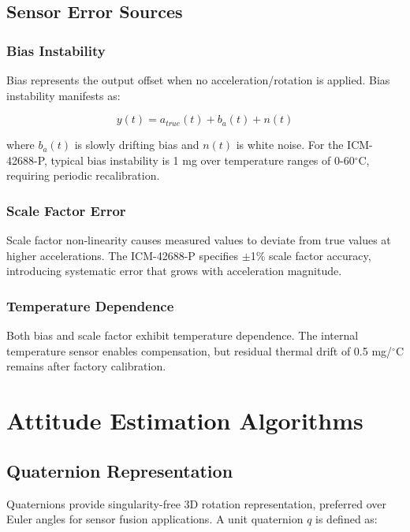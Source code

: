\subsection{Sensor Error Sources}

\subsubsection{Bias Instability}

Bias represents the output offset when no acceleration/rotation is applied. Bias instability manifests as:

\begin{equation}
    y(t) = a_{true}(t) + b_a(t) + n(t)
\end{equation}

where $b_a(t)$ is slowly drifting bias and $n(t)$ is white noise. For the ICM-42688-P, typical bias instability is 1 mg over temperature ranges of 0-60$^\circ$C, requiring periodic recalibration.

\subsubsection{Scale Factor Error}

Scale factor non-linearity causes measured values to deviate from true values at higher accelerations. The ICM-42688-P specifies $\pm$1\% scale factor accuracy, introducing systematic error that grows with acceleration magnitude.

\subsubsection{Temperature Dependence}

Both bias and scale factor exhibit temperature dependence. The internal temperature sensor enables compensation, but residual thermal drift of 0.5 mg/$^\circ$C remains after factory calibration.

\section{Attitude Estimation Algorithms}

\subsection{Quaternion Representation}

Quaternions provide singularity-free 3D rotation representation, preferred over Euler angles for sensor fusion applications. A unit quaternion $q$ is defined as:

